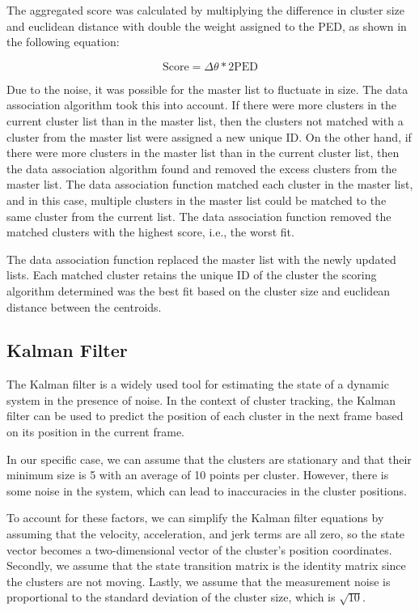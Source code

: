 \documentclass[journal]{IEEEtran} %
\begin{document}
The aggregated score was calculated by multiplying the difference in cluster size and euclidean distance with double the weight assigned to the PED, as shown in the following equation:

\[ 
\text{Score} = \Delta \theta * 2  \text{PED}
\]

Due to the noise, it was possible for the master list to fluctuate in size. The data association algorithm took this into account. If there were more clusters in the current cluster list than in the master list, then the clusters not matched with a cluster from the master list were assigned a new unique ID. On the other hand, if there were more clusters in the master list than in the current cluster list, then the data association algorithm found and removed the excess clusters from the master list. The data association function matched each cluster in the master list, and in this case, multiple clusters in the master list could be matched to the same cluster from the current list. The data association function removed the matched clusters with the highest score, i.e., the worst fit.

The data association function replaced the master list with the newly updated lists. Each matched cluster retains the unique ID of the cluster the scoring algorithm determined was the best fit based on the cluster size and euclidean distance between the centroids. 


\subsection{Kalman Filter}
The Kalman filter is a widely used tool for estimating the state of a dynamic system in the presence of noise. In the context of cluster tracking, the Kalman filter can be used to predict the position of each cluster in the next frame based on its position in the current frame.

In our specific case, we can assume that the clusters are stationary and that their minimum size is 5 with an average of 10 points per cluster. However, there is some noise in the system, which can lead to inaccuracies in the cluster positions.

To account for these factors, we can simplify the Kalman filter equations by assuming that the velocity, acceleration, and jerk terms are all zero, so the state vector becomes a two-dimensional vector of the cluster's position coordinates. Secondly, we assume that the state transition matrix is the identity matrix since the clusters are not moving. Lastly, we assume that the measurement noise is proportional to the standard deviation of the cluster size, which is $\sqrt{10}$.
\end{document}
